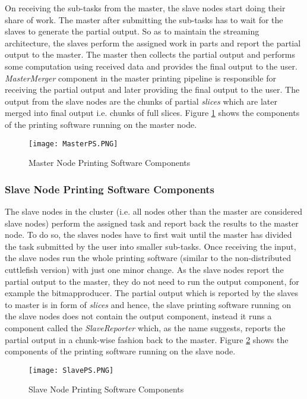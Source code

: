 On receiving the sub-tasks from the master, the slave nodes start doing their share of work. The master after submitting the sub-tasks has to wait for the slaves to generate the partial output. So as to maintain the streaming architecture, the slaves perform the assigned work in parts and report the partial output to the master. The master then collects the partial output and performs some computation using received data and provides the final output to the user. \textit{MasterMerger} component in the master printing pipeline is responsible for receiving the partial output and later providing the final output to the user. The output from the slave nodes are the chunks of partial \textit{slices} which are later merged into final output i.e. chunks of full slices. Figure \ref{fig:MasterPS} shows the components of the printing software running on the master node.
\begin{figure}[ht!]
\centering
\texttt{[image: MasterPS.PNG]}
\caption{Master Node Printing Software Components }
\label{fig:MasterPS}
\end{figure}


\subsubsection{Slave Node Printing Software Components}

The slave nodes in the cluster (i.e. all nodes other than the master are considered slave nodes) perform the assigned task and report back the results to the master node. To do so, the slaves nodes have to first wait until the master has divided the task submitted by the user into smaller sub-tasks. Once receiving the input, the slave nodes run the whole printing software (similar to the non-distributed cuttlefish version) with just one minor change. As the slave nodes report the partial output to the master, they do not need to run the output component, for example the bitmapproducer. The partial output which is reported by the slaves to master is in form of \textit{slices} and hence, the slave printing software running on the slave nodes does not contain the output component, instead it runs a component called the \textit{SlaveReporter} which, as the name suggests, reports the partial output in a chunk-wise fashion back to the master. Figure \ref{fig:SlavePS} shows the components of the printing software running on the slave node.
\begin{figure}[ht!]
\centering
\texttt{[image: SlavePS.PNG]}
\caption{Slave Node Printing Software Components }
\label{fig:SlavePS}
\end{figure}


